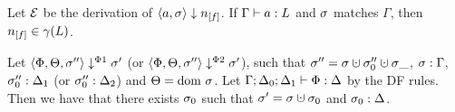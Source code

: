\begin{lemma}
    \label{lem:gamma-arithm}
    Let $\operatorname{\mathcal{E}}$ be the derivation of $\bigstep{a}{\sigma}{\flagged{}}$.
    If $\Gamma \vdash {a}: L$ and $\sigma$ matches $\Gamma$, then $\flagged{} \in \gamma(L)$.
\end{lemma}

\begin{lemma}
    \label{thm:preservation-phi}
    Let $\langle \Phi, \Theta, \sigma'' \rangle \downarrow^{\Phi1} \sigma'$ (or $\langle \Phi, \Theta, \sigma'' \rangle \downarrow^{\Phi2} \sigma'$),
    such that $\store'' = \store \dunion \store_0''\dunion \store{\_}$, ${\sigma}:{\Gamma}$, 
    ${\sigma_0''}:{\Delta_1}$ (or ${\sigma_0''}:{\Delta_2}$) and $\Theta = \text{dom }{\sigma}$.
    Let $\Gamma;\Delta_0;\Delta_1 \vdash {\Phi}: \Delta$ by the DF rules.
    Then we have that there exists $\sigma_0$ such that $\store' = \store \dunion \store_0$
    and ${\sigma_0}:{\Delta}$.
\end{lemma}

